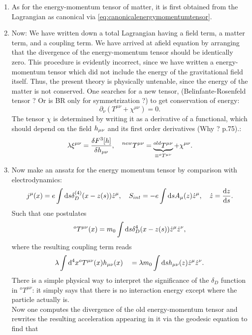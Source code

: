 \begin{enumerate}
\item As for the energy-momentum tensor of matter, it is first obtained from the Lagrangian as canonical via \ref{eq:canonicalenergymomentumtensor}. 
\item Now: We have written down a total Lagrangian having a field term, a matter term, and a coupling term. We have arrived at afield equation by arranging that the divergence of the energy-momentum tensor should be identically zero. This procedure is evidently incorrect, since we have written a energy-momentum tensor which did not include the energy of the gravitational field itself. Thus, the present theory is physically untenable, since the energy of the matter is not conserved. One searches for a new tensor, (Belinfante-Rosenfeld tensor ? Or is BR only for symmetrization ?) to get conservation of energy:
\begin{equation}
\partial_\nu (T^{\mu \nu} + \chi^{\mu \nu}) = 0.
\end{equation}
The tensor $\chi$ is determined by writing it as a derivative of a functional, which should depend on the field $h_{\mu \nu}$ and its first order derivatives (Why ? p.75).:
\begin{equation}
\lambda \xi^{\mu \nu} = \frac{\delta F^3 [h]}{\delta h_{\mu \nu}},\quad ^{new}T^{\mu \nu} = \underbrace{^{old}T^{\mu \nu}}_{\equiv ^oT^{\mu \nu}} + \chi^{\mu \nu}.
\end{equation}
\item Now make an ansatz for the energy momentum tensor by comparison with electrodynamics:
\begin{equation}
	j^{\mu} (x) = e \int \mathrm{d} s \delta^{(4)}_D(x-z(s)) \dot{z}^\mu, \quad S_{int} = -e \int \mathrm{d} s A_\mu (z) \dot{z}^\mu, \quad \dot{z} = \frac{\mathrm{d} z}{\mathrm{d} s}.
\end{equation}
Such that one postulates
\begin{equation}
	^oT^{\mu \nu} (x) = m_0 \int \mathrm{d} s \delta^4_D(x-z(s)) \dot{z}^\mu  \dot{z}^\nu,
\end{equation}
where the resulting coupling term reads
\begin{equation}
	\lambda \int \mathrm{d}^4x ^oT^{\mu \nu}(x) h_{\mu \nu} (x) \quad = \lambda m_0 \int \mathrm{d} s h_{\mu \nu} (z) \dot{z}^\mu \dot{z}^\nu.
\end{equation}
There is a simple physical way to interpret the significance of the $\delta_D$ function in $^oT^{\mu \nu}$: it simply says that there is no interaction energy except where the particle actually is.\\
Now one computes the divergence of the old energy-momentum tensor and rewrites the resulting acceleration appearing in it via the geodesic equation to find that

\end{enumerate}
